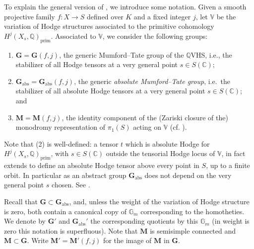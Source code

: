 \documentclass[10pt]{article}
\numberwithin{equation}{section}
\theoremstyle{plain}
\theoremstyle{definition}
\theoremstyle{remark}
\newcommand{\V}{\mathbb{V}}
\begin{document}
To explain the general version of , we introduce some notation. Given a smooth projective family $f : X \to S$ defined over $K$ and a fixed integer $j$, let $\V$ be the variation of Hodge structures associated to the primitive cohomology $H^j(X_s, \mathbb{Q})_{\mathrm{prim}}$. Associated to $\V$, we consider the following groups:
\begin{enumerate}
\item[(1)] $\mathbf{G}=\mathbf{G}(f,j)$, the generic Mumford--Tate group of the $\mathbb{Q}$VHS, i.e., the stabilizer of all Hodge tensors at a very general point $s \in S(\mathbb{C})$;
\item[(2)] $\mathbf{G}_{\mathrm{abs}}=\mathbf{G}_{\mathrm{abs}}(f,j)$, the generic \emph{absolute Mumford--Tate group}, i.e.\ the stabilizer of all absolute Hodge tensors at a very general point $s \in S(\mathbb{C})$; and
\item[(3)] $\mathbf{M}=\mathbf{M}(f,j)$, the identity component of the (Zariski closure of the) monodromy representation of $\pi_1(S)$ acting on $\V$ (cf. ).
\end{enumerate}
Note that (2) is well-defined: a tensor $t$ which is absolute Hodge for $H^j(X_s, \mathbb{Q})_{\mathrm{prim}}$, with $s \in S(\mathbb{C})$ outside the tensorial Hodge locus of $\mathbb{V}$, in fact extends to define an absolute Hodge tensor above every point in $S$, up to a finite orbit. In particular as an abstract group $\mathbf{G}_{\textrm{abs}}$ does not depend on the very general point $s$ chosen. See \cite[Prop. 5.6]{zbMATH06492665}. 



Recall that $\mathbf{G} \subset \mathbf{G}_{\mathrm{abs}}$, and, unless the weight of the variation of Hodge structure is zero, both contain a canonical copy of $\mathbb{G}_m$ corresponding to the homotheties. We denote by $\mathbf{G}'$ and $\mathbf{G}_{\mathrm{abs}}'$ the corresponding quotients by this $\mathbb{G}_m$ (in weight is zero this notation is superfluous). Note that $\mathbf{M}$ is semisimple connected and $\mathbf{M} \subset \mathbf{G}$. Write $\mathbf{M}' = \mathbf{M}'(f,j)$ for the image of $\mathbf{M}$ in $\mathbf{G}$.
\end{document}
